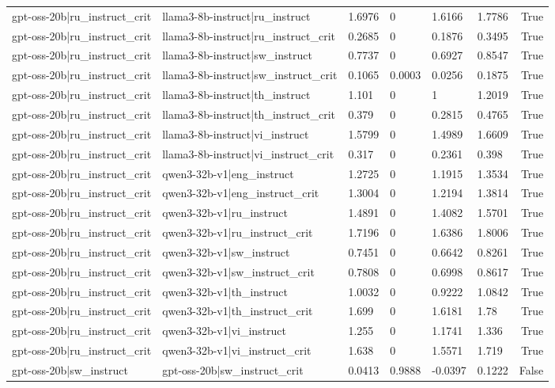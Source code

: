 \begin{table}
\begin{tabular}{llllllr}
gpt-oss-20b|ru_instruct_crit & llama3-8b-instruct|ru_instruct & 1.6976 & 0 & 1.6166 & 1.7786 & True \\
gpt-oss-20b|ru_instruct_crit & llama3-8b-instruct|ru_instruct_crit & 0.2685 & 0 & 0.1876 & 0.3495 & True \\
gpt-oss-20b|ru_instruct_crit & llama3-8b-instruct|sw_instruct & 0.7737 & 0 & 0.6927 & 0.8547 & True \\
gpt-oss-20b|ru_instruct_crit & llama3-8b-instruct|sw_instruct_crit & 0.1065 & 0.0003 & 0.0256 & 0.1875 & True \\
gpt-oss-20b|ru_instruct_crit & llama3-8b-instruct|th_instruct & 1.101 & 0 & 1 & 1.2019 & True \\
gpt-oss-20b|ru_instruct_crit & llama3-8b-instruct|th_instruct_crit & 0.379 & 0 & 0.2815 & 0.4765 & True \\
gpt-oss-20b|ru_instruct_crit & llama3-8b-instruct|vi_instruct & 1.5799 & 0 & 1.4989 & 1.6609 & True \\
gpt-oss-20b|ru_instruct_crit & llama3-8b-instruct|vi_instruct_crit & 0.317 & 0 & 0.2361 & 0.398 & True \\
gpt-oss-20b|ru_instruct_crit & qwen3-32b-v1|eng_instruct & 1.2725 & 0 & 1.1915 & 1.3534 & True \\
gpt-oss-20b|ru_instruct_crit & qwen3-32b-v1|eng_instruct_crit & 1.3004 & 0 & 1.2194 & 1.3814 & True \\
gpt-oss-20b|ru_instruct_crit & qwen3-32b-v1|ru_instruct & 1.4891 & 0 & 1.4082 & 1.5701 & True \\
gpt-oss-20b|ru_instruct_crit & qwen3-32b-v1|ru_instruct_crit & 1.7196 & 0 & 1.6386 & 1.8006 & True \\
gpt-oss-20b|ru_instruct_crit & qwen3-32b-v1|sw_instruct & 0.7451 & 0 & 0.6642 & 0.8261 & True \\
gpt-oss-20b|ru_instruct_crit & qwen3-32b-v1|sw_instruct_crit & 0.7808 & 0 & 0.6998 & 0.8617 & True \\
gpt-oss-20b|ru_instruct_crit & qwen3-32b-v1|th_instruct & 1.0032 & 0 & 0.9222 & 1.0842 & True \\
gpt-oss-20b|ru_instruct_crit & qwen3-32b-v1|th_instruct_crit & 1.699 & 0 & 1.6181 & 1.78 & True \\
gpt-oss-20b|ru_instruct_crit & qwen3-32b-v1|vi_instruct & 1.255 & 0 & 1.1741 & 1.336 & True \\
gpt-oss-20b|ru_instruct_crit & qwen3-32b-v1|vi_instruct_crit & 1.638 & 0 & 1.5571 & 1.719 & True \\
gpt-oss-20b|sw_instruct & gpt-oss-20b|sw_instruct_crit & 0.0413 & 0.9888 & -0.0397 & 0.1222 & False \\

\end{tabular}
\end{table}
